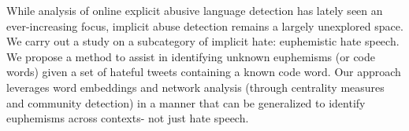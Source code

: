 While analysis of online explicit abusive language detection has lately seen an ever-increasing focus, implicit abuse detection remains a largely unexplored space. We carry out a study on a subcategory of implicit hate: euphemistic hate speech. We propose a method to assist in identifying unknown euphemisms (or code words) given a set of hateful tweets containing a known code word. Our approach leverages word embeddings and network analysis (through centrality measures and community detection) in a manner that can be generalized to identify euphemisms across contexts- not just hate speech.
